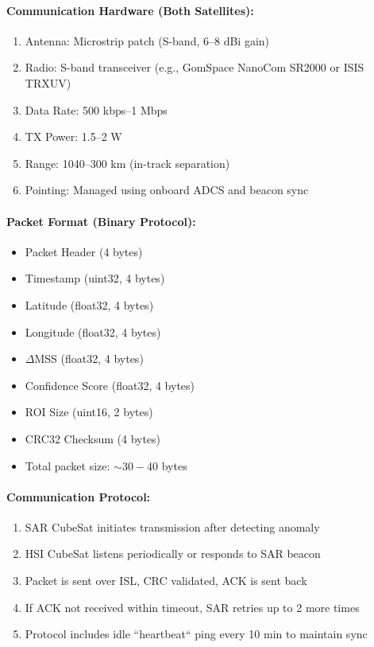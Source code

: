 \documentclass[12pt]{article}
\begin{document}
\paragraph{Communication Hardware (Both Satellites):}
\begin{enumerate}
    \item Antenna: Microstrip patch (S-band, 6--8 dBi gain)
    \item Radio: S-band transceiver (e.g., GomSpace NanoCom SR2000 or ISIS TRXUV)
    \item Data Rate: 500 kbps--1 Mbps
    \item TX Power: 1.5--2 W
    \item Range: 1040--300 km (in-track separation)
    \item Pointing: Managed using onboard ADCS and beacon sync
\end{enumerate}
\paragraph{Packet Format (Binary Protocol):}
\begin{itemize}
    \item Packet Header (4 bytes)
    \item Timestamp (uint32, 4 bytes)
    \item Latitude (float32, 4 bytes)
    \item Longitude (float32, 4 bytes)
    \item $\Delta$MSS (float32, 4 bytes)
    \item Confidence Score (float32, 4 bytes)
    \item ROI Size (uint16, 2 bytes)
    \item CRC32 Checksum (4 bytes)
    \item Total packet size: $\sim 30-40$ bytes
\end{itemize}
\paragraph{Communication Protocol:}
\begin{enumerate}
    \item SAR CubeSat initiates transmission after detecting anomaly
    \item HSI CubeSat listens periodically or responds to SAR beacon
    \item Packet is sent over ISL, CRC validated, ACK is sent back
    \item If ACK not received within timeout, SAR retries up to 2 more times
    \item Protocol includes idle ``heartbeat`` ping every 10 min to maintain sync
\end{enumerate}
\end{document}
